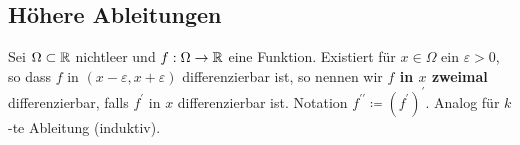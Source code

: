 \subsection{Höhere Ableitungen}
\begin{subdefinition}
	Sei $ \Omega \subset \mathbb{R}  $ nichtleer und $ f : \Omega \to \mathbb{R}  $ eine Funktion.
	Existiert für $ x \in \Omega $ ein $ \varepsilon > 0 $, so dass $ f $ in $ ( x - \varepsilon , x + \varepsilon ) $ differenzierbar ist, so nennen wir \textbf{$ f $ in $ x $ zweimal} differenzierbar, falls $ f^\prime $ in $ x $ differenzierbar ist.
	Notation $ f^{\prime\prime} \coloneqq \left( f^\prime \right) ^\prime $.
	Analog für $ k $-te Ableitung (induktiv).
\end{subdefinition}


